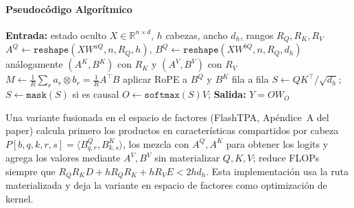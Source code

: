 \paragraph{Pseudocódigo Algorítmico}
\begin{algorithmic}[1]
\State \textbf{Entrada:} estado oculto $X\in\mathbb{R}^{n\times d}$, $h$ cabezas, ancho $d_h$, rangos $R_Q,R_K,R_V$
\State $A^Q\gets\texttt{reshape}(XW^{aQ}, n, R_Q, h)$, \quad $B^Q\gets\texttt{reshape}(XW^{bQ}, n, R_Q, d_h)$
\State análogamente $(A^K,B^K)$ con $R_K$ y $(A^V,B^V)$ con $R_V$ 
    \State $M\gets \frac{1}{R}\sum_{r} a_r\otimes b_r = \frac{1}{R}A^{\top}B$ 
\EndFor
\State aplicar RoPE a $B^Q$ y $B^K$ fila a fila 
\State $S\gets QK^{\top}/\sqrt{d_h}$; \quad $S\gets\texttt{mask}(S)$ si es causal
\State $O\gets\texttt{softmax}(S)V$; \quad \textbf{Salida:} $Y=OW_O$
\end{algorithmic}
Una variante fusionada en el espacio de factores (FlashTPA, Apéndice~A del paper) calcula primero los productos en características compartidos por cabeza $P[b,q,k,r,s]=\langle B^Q_{q,r},B^K_{k,s}\rangle$, los mezcla con $A^Q,A^K$ para obtener los logits y agrega los valores mediante $A^V,B^V$ sin materializar $Q,K,V$; reduce FLOPs siempre que $R_QR_KD + hR_QR_K + hR_VE < 2hd_h$. Esta implementación usa la ruta materializada y deja la variante en espacio de factores como optimización de kernel.


